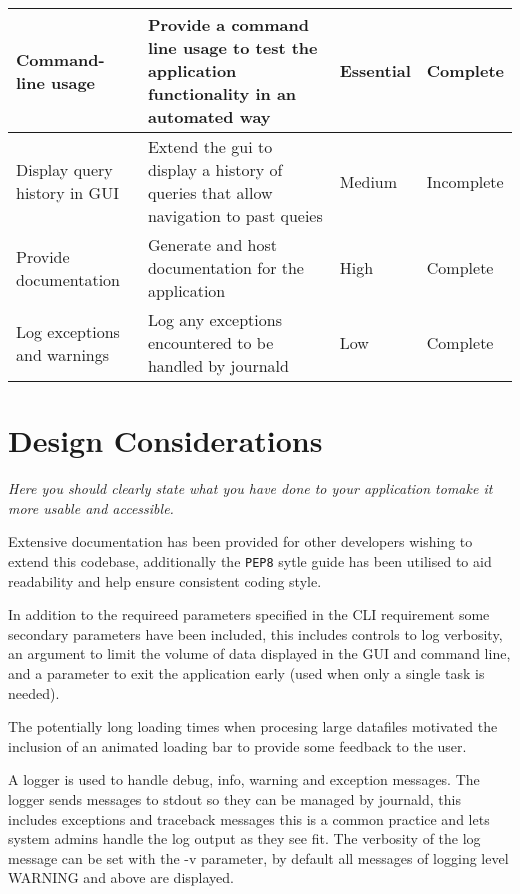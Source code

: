 \documentclass[11pt]{article}
\newcommand{\code}[1]{\colorbox{light-gray}{\texttt{#1}}}
\begin{document}
\begin{center}
\begin{longtable}{|p{3cm}|p{7cm}|l|p{2cm}|}
        \hline
        Command-line usage & Provide a command line usage to test the application functionality in an automated way & \textbf{Essential} & Complete \\
        \hline
        Display query history in GUI & Extend the gui to display a history of queries that allow navigation to past queies & Medium & Incomplete \\
        \hline
        Provide documentation & Generate and host documentation for the application & High & Complete \\ 
        \hline
        Log exceptions and warnings & Log any exceptions encountered to be handled by journald & Low & Complete \\
        \hline

    \end{longtable}
\end{center}


\section{Design Considerations}
\emph{Here you should clearly state what you have done to your application tomake it more usable and accessible.}

Extensive documentation has been provided for other developers wishing to extend this codebase, additionally the \code{PEP8} sytle guide has been utilised to aid readability and help ensure consistent coding style. 

In addition to the requireed parameters specified in the CLI requirement some secondary parameters have been included, this includes controls to log verbosity, an argument to limit the volume of data displayed in the GUI and command line, and a parameter to exit the application early (used when only a single task is needed).

The potentially long loading times when procesing large datafiles motivated the inclusion of an animated loading bar to provide some feedback to the user.

A logger is used to handle debug, info, warning and exception messages. The logger sends messages to stdout so they can be managed by journald, this includes exceptions and traceback messages this is a common practice and lets system admins handle the log output as they see fit. The verbosity of the log message can be set with the -v parameter, by default all messages of logging level WARNING and above are displayed.
\end{document}

